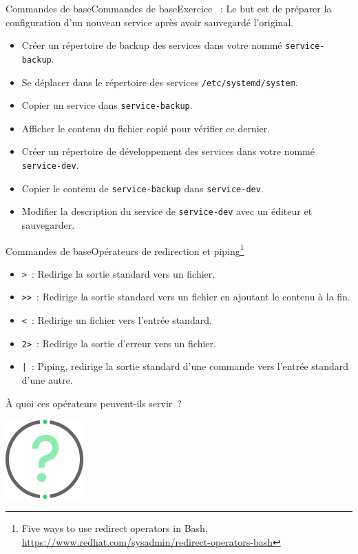 \documentclass{beamer}
\begin{document}
    \begin{frame}{Commandes de base}{Commandes de base}{Exercice \execcounterdispinc{}~:}
        Le but est de préparer la configuration d'un nouveau service après avoir sauvegardé l'original.
        \begin{itemize}
            \item Créer un répertoire de backup des services dans votre  nommé \lstinline{service-backup}.
            \item Se déplacer dans le répertoire des services \lstinline{/etc/systemd/system}.
            \item Copier un service dans \lstinline{service-backup}.
            \item Afficher le contenu du fichier copié pour vérifier ce dernier.
            \item Créer un répertoire de développement des services dans votre  nommé \lstinline{service-dev}.
            \item Copier le contenu de \lstinline{service-backup} dans \lstinline{service-dev}.
            \item Modifier la description du service de \lstinline{service-dev} avec un éditeur et sauvegarder.
        \end{itemize}
    \end{frame}

    \begin{frame}{Commandes de base}{Opérateurs de redirection et piping\footnote{Five ways to use redirect operators in Bash, \url{https://www.redhat.com/sysadmin/redirect-operators-bash}}}
        \begin{itemize}
            \item \lstinline{>}~: Redirige la sortie standard vers un fichier.
            \item \lstinline{>>}~: Redirige la sortie standard vers un fichier en ajoutant le contenu à la fin.
            \item \lstinline{<}~: Redirige un fichier vers l'entrée standard.
            \item \lstinline{2>}~: Redirige la sortie d'erreur vers un fichier.
            \item \lstinline{|}~: Piping, redirige la sortie standard d'une commande vers l'entrée standard d'une autre.
        \end{itemize}
        À quoi ces opérateurs peuvent-ils servir~?
        \begin{center}
            \includegraphics[width=3cm]{image/question-mark}
        \end{center}
    \end{frame}
\end{document}
